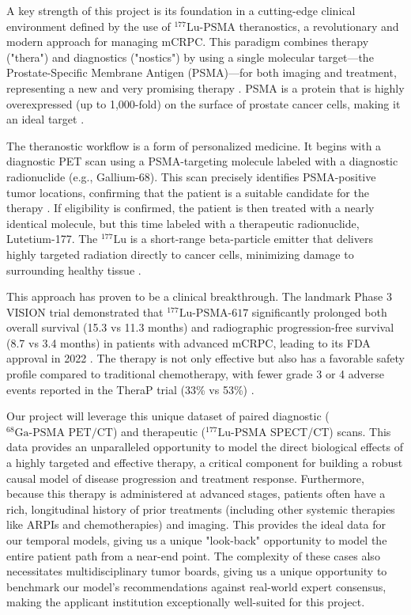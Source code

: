 \documentclass[11pt, a4paper]{article}
\begin{document}
A key strength of this project is its foundation in a cutting-edge clinical environment defined by the use of $^{\text{177}}\text{Lu-PSMA}$ theranostics, a revolutionary and modern approach for managing mCRPC. This paradigm combines therapy ("thera") and diagnostics ("nostics") by using a single molecular target—the Prostate-Specific Membrane Antigen (PSMA)—for both imaging and treatment, representing a new and very promising therapy \cite{HennrichEder2022}. PSMA is a protein that is highly overexpressed (up to 1,000-fold) on the surface of prostate cancer cells, making it an ideal target \cite{HennrichEder2022, LingBlois2022}.

The theranostic workflow is a form of personalized medicine. It begins with a diagnostic PET scan using a PSMA-targeting molecule labeled with a diagnostic radionuclide (e.g., Gallium-68). This scan precisely identifies PSMA-positive tumor locations, confirming that the patient is a suitable candidate for the therapy \cite{HennrichEder2022, KaewputVinjamuri2022}. If eligibility is confirmed, the patient is then treated with a nearly identical molecule, but this time labeled with a therapeutic radionuclide, Lutetium-177. The ${}^{177}\text{Lu}$ is a short-range beta-particle emitter that delivers highly targeted radiation directly to cancer cells, minimizing damage to surrounding healthy tissue \cite{HennrichEder2022, SadaghianiSheikhbahaei2022}.

This approach has proven to be a clinical breakthrough. The landmark Phase 3 VISION trial demonstrated that ${}^{177}\text{Lu-PSMA-617}$ significantly prolonged both overall survival (15.3 vs 11.3 months) and radiographic progression-free survival (8.7 vs 3.4 months) in patients with advanced mCRPC, leading to its FDA approval in 2022 \cite{TschanBorgna2022, ChandranFigg2022, RamnaraignSartor2023, JangKendi2023}. The therapy is not only effective but also has a favorable safety profile compared to traditional chemotherapy, with fewer grade 3 or 4 adverse events reported in the TheraP trial (33\% vs 53\%) \cite{HofmanEmmett2024, PatellKurian2023}.

Our project will leverage this unique dataset of paired diagnostic ($^{\text{68}}\text{Ga-PSMA PET/CT}$) and therapeutic ($^{\text{177}}\text{Lu-PSMA}$ SPECT/CT) scans. This data provides an unparalleled opportunity to model the direct biological effects of a highly targeted and effective therapy, a critical component for building a robust causal model of disease progression and treatment response. Furthermore, because this therapy is administered at advanced stages, patients often have a rich, longitudinal history of prior treatments (including other systemic therapies like ARPIs and chemotherapies) and imaging. This provides the ideal data for our temporal models, giving us a unique "look-back" opportunity to model the entire patient path from a near-end point. The complexity of these cases also necessitates multidisciplinary tumor boards, giving us a unique opportunity to benchmark our model's recommendations against real-world expert consensus, making the applicant institution exceptionally well-suited for this project.
\end{document}
